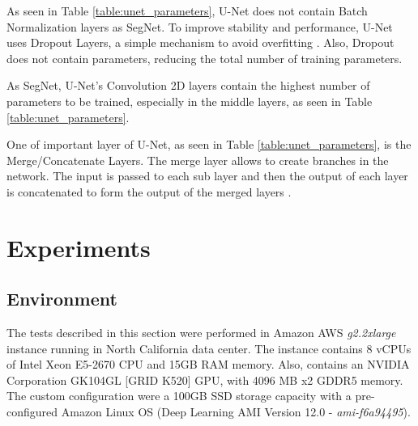 \documentclass[10pt,twocolumn,letterpaper]{article}
\begin{document}
As seen in Table \ref{table:unet_parameters}, U-Net does not contain Batch Normalization layers as SegNet. To improve stability and performance, U-Net uses Dropout Layers, a simple mechanism to avoid overfitting \cite{DROPOUT}. Also, Dropout does not contain parameters, reducing the total number of training parameters.

As SegNet, U-Net's Convolution 2D layers contain the highest number of parameters to be trained, especially in the middle layers, as seen in Table \ref{table:unet_parameters}.

One of important layer of U-Net, as seen in Table \ref{table:unet_parameters}, is the Merge/Concatenate Layers. The merge layer allows to create branches in the network. The input is passed to each sub layer and then the output of each layer is concatenated to form the output of the merged layers \cite{MERGE_WEBSITE}.


\section{Experiments} \label{sec:experiments}


\subsection{Environment} \label{ssec:environment}

The tests described in this section were performed in Amazon AWS \cite{AMAZON_WEBSITE} \textit{g2.2xlarge} instance running in North California data center. The instance contains 8 vCPUs of Intel Xeon E5-2670 CPU and 15GB RAM memory. Also, contains an NVIDIA Corporation GK104GL [GRID K520] GPU, with 4096 MB x2 GDDR5 memory. The custom configuration were a 100GB SSD storage capacity with a pre-configured Amazon Linux OS (Deep Learning AMI Version 12.0 - \textit{ami-f6a94495}).
\end{document}

